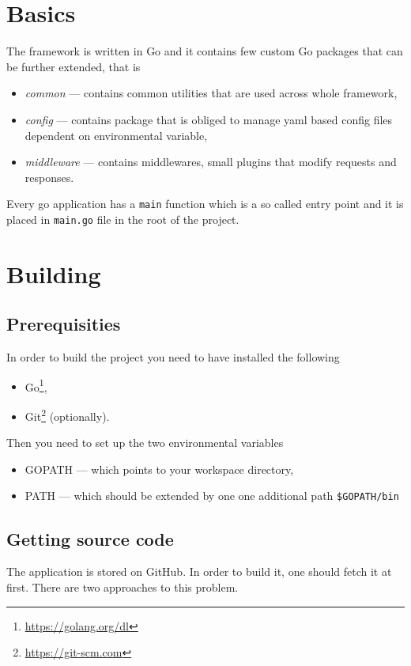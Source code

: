 \section{Basics}
The framework is written in Go and it contains few custom Go packages\cite{Packages-go} that can be further extended, that is
\begin{itemize}
\item \textit{common} --- contains common utilities that are used across whole framework,
\item \textit{config} --- contains package that is obliged to manage yaml based config files dependent on environmental variable,
\item \textit{middleware} --- contains middlewares, small plugins that modify requests and responses.
\end{itemize}
Every go application has a \verb|main| function which is a so called entry point and it is placed in \verb|main.go| file in the root of the project.

\section{Building}

\subsection{Prerequisities}
In order to build the project you need to have installed the following
\begin{itemize}
\item Go\footnote{\url{https://golang.org/dl}},
\item Git\footnote{\label{git-src}\url{https://git-scm.com}} (optionally).
\end{itemize}
Then you need to set up the two environmental variables
\begin{itemize}
\item GOPATH\cite[The GOPATH environment variable]{Packages-go} --- which points to your workspace directory,
\item PATH --- which should be extended by one one additional path \verb|$GOPATH/bin|
\end{itemize}

\subsection{Getting source code}
The application is stored on GitHub. In order to build it, one should fetch it at first. There are two approaches to this problem.

